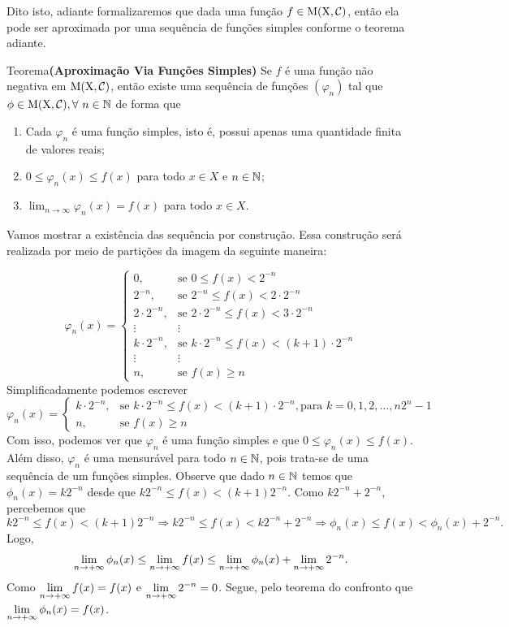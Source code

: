 Dito isto, adiante formalizaremos que dada uma função $f \in \operatorname{M(X, \mathcal{C} )}$, então ela pode ser aproximada por uma sequência de funções simples conforme o teorema adiante.

\begin{env}{Teorema}\textbf{(Aproximação Via Funções Simples)}
	\label{teo:aproximação via funções simples}
	Se $f$ é uma função não negativa em $\operatorname{M(X, \mathcal{C} )}$, então existe uma sequência de funções $(\varphi_n)$ tal que $\phi \in \operatorname{M(X, \mathcal{C} )}, \forall \ n \in \operatorname{\mathbb{N}}$ de forma que
	\begin{enumerate}[label*=(\roman*)]
		\item Cada $\varphi_n$ é uma função simples, isto é, possui apenas uma quantidade finita de valores reais;
		\item $0 \leq \varphi_n(x) \leq f(x)$ para todo $x \in X$ e $n \in \operatorname{\mathbb{N}}$;
		\item $\displaystyle\lim_{n \to \infty} \varphi_n(x) = f(x)$ para todo $x \in X$.
	\end{enumerate}
\end{env} 

\begin{prova}
	Vamos mostrar a existência das sequência por construção.
	Essa construção será realizada por meio de partições da imagem da seguinte maneira:
	
	$$
	\varphi_n(x) =\left\{
	\begin{array}{ll}
		0, & \textrm{se\ } 0 \leq f(x) < 2^{-n} \\
		2^{-n}, & \textrm{se\ } 2^{-n} \leq f(x) < 2\cdot2^{-n} \\
		2\cdot2^{-n}, & \textrm{se\ } 2\cdot2^{-n} \leq f(x) < 3\cdot2^{-n} \\
		\vdots & \vdots \\
		k\cdot2^{-n}, & \textrm{se\ } k\cdot2^{-n} \leq f(x) < (k+1)\cdot2^{-n} \\
		\vdots & \vdots \\
		n, & \textrm{se\ } f(x) \geq n
	\end{array}
	\right.
	$$
	Simplificadamente podemos escrever
	$$
	\varphi_n(x) =\left\{
	\begin{array}{ll}
		k\cdot2^{-n}, & \textrm{se\ } k\cdot2^{-n} \leq f(x) < (k+1)\cdot2^{-n}, \textrm{para } k = 0,1,2, \ldots, n2^n-1 \\
		n, & \textrm{se\ } f(x) \geq n
	\end{array}
	\right.
	$$
	Com isso, podemos ver que $\varphi_n$ é uma função simples e que $0\leq \varphi_n(x)\leq f(x)$. Além disso, $\varphi_n$ é uma mensurável para todo $n \in \operatorname{\mathbb{N}}$, pois trata-se de uma sequência de um funções simples.
	Observe que dado $n \in \operatorname{\mathbb{N}}$ temos que
	$\phi_n(x) = k2^{-n}$ desde que 
	$k2^{-n} \leq f(x) < (k+1)2^{-n}$.
	Como  $k2^{-n}+2^{-n}$, percebemos que
	$$
	k2^{-n} \leq f(x) < (k+1)2^{-n}
	\Rightarrow
	k2^{-n} \leq f(x) < k2^{-n} + 2^{-n}
	\Rightarrow
	\phi_n(x) \leq f(x) < \phi_n(x) + 2^{-n}.
	$$
	Logo, 
	$$
	\displaystyle \lim_{n \to +\infty}\phi_n(x)  
	\leq 
	\displaystyle \lim_{n \to +\infty}f(x) 
	\leq 
	\displaystyle \lim_{n \to +\infty}\phi_n(x) 
	+ 
	\displaystyle \lim_{n \to +\infty}2^{-n}.
	$$
	Como $\displaystyle \lim_{n \to +\infty} f(x) = f(x)$ e 
	$\displaystyle \lim_{n \to +\infty} 2^{-n} = 0$.
	Segue, pelo teorema do confronto que
	$\displaystyle \lim_{n \to +\infty} \phi_n(x) = f(x)$.
\end{prova}


